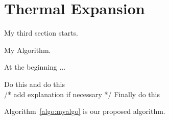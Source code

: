 \documentclass[11pt,a4paper,onecolumn,oneside]{report}
\begin{document}
\section{Thermal Expansion} 
My third section starts. 

\begin{algorithm}
	\caption{My Algorithm.} \label{algo:myalgo}
    At the beginning ...
    
	\begin{algorithmic}[1]	    
	    \STATE Do this
        \STATE and do this\\
        /* add explanation if necessary */
        \STATE Finally do this
	\end{algorithmic} 
\end{algorithm}
%
Algorithm~\ref{algo:myalgo} is our proposed algorithm.
\end{document}
